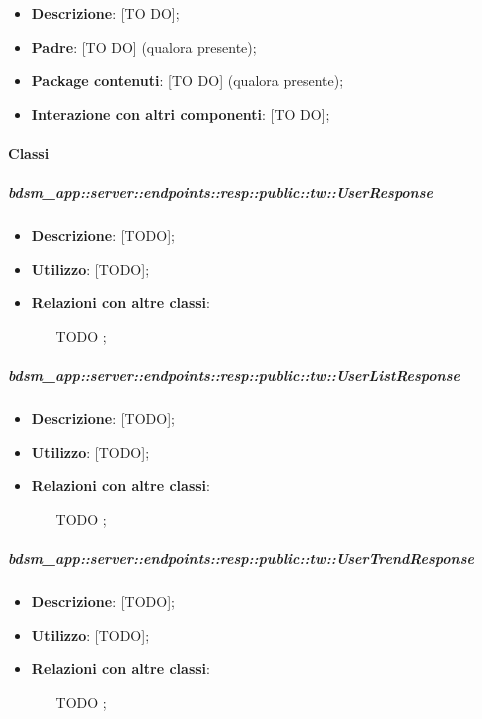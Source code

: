 \begin{itemize}
  \item \textbf{Descrizione}: [TO DO];
  \item \textbf{Padre}: [TO DO] (qualora presente);
  \item \textbf{Package contenuti}: [TO DO] (qualora presente);
  \item \textbf{Interazione con altri componenti}: [TO DO];
\end{itemize}

	\paragraph{Classi} %

    \subparagraph{bdsm\_app::server::endpoints::resp::public::tw::UserResponse} %
    \label{subp:bdsm_app_server_endpoints_resp_public_tw_userresponse}
    \begin{itemize}
      \item \textbf{Descrizione}: [TODO];
      \item \textbf{Utilizzo}: [TODO];
      \item \textbf{Relazioni con altre classi}:
        \begin{itemize}
          \item [TODO];
        \end{itemize}
      \end{itemize}
    
    \subparagraph{bdsm\_app::server::endpoints::resp::public::tw::UserListResponse} %
    \label{subp:bdsm_app_server_endpoints_resp_public_tw_userlistresponse}
    \begin{itemize}
      \item \textbf{Descrizione}: [TODO];
      \item \textbf{Utilizzo}: [TODO];
      \item \textbf{Relazioni con altre classi}:
        \begin{itemize}
          \item [TODO];
        \end{itemize}
      \end{itemize}
    
    \subparagraph{bdsm\_app::server::endpoints::resp::public::tw::UserTrendResponse} %
    \label{subp:bdsm_app_server_endpoints_resp_public_tw_usertrendresponse}
    \begin{itemize}
      \item \textbf{Descrizione}: [TODO];
      \item \textbf{Utilizzo}: [TODO];
      \item \textbf{Relazioni con altre classi}:
        \begin{itemize}
          \item [TODO];
        \end{itemize}
      \end{itemize}
    
